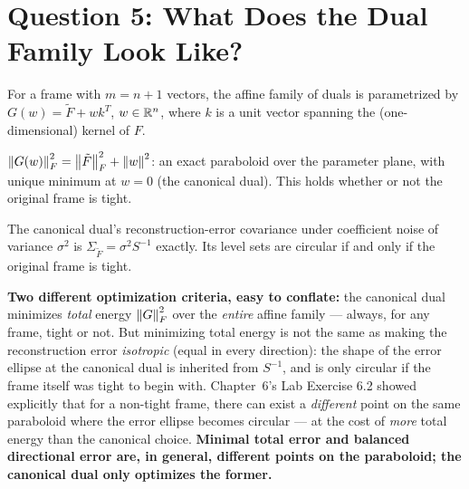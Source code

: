 \section{Question 5: What Does the Dual Family Look Like?}
\label{sec:review-q5}

\begin{proposition}
\label{rev:prop-dual-plane}
For a frame with $m=n+1$ vectors, the affine family of duals is
parametrized by $G(w)=\tilde F+wk^T$, $w\in\mathbb{R}^n$, where $k$ is a unit
vector spanning the (one-dimensional) kernel of $F$.
\end{proposition}

\begin{theorem}
\label{rev:thm-paraboloid}
$\left\| G(w) \right\|_F^2=\left\| \tilde F \right\|_F^2+\left\| w \right\|^2$: an exact paraboloid
over the parameter plane, with unique minimum at $w=0$ (the canonical
dual). This holds whether or not the original frame is tight.
\end{theorem}

\begin{proposition}
\label{rev:prop-error-cov}
The canonical dual's reconstruction-error covariance under coefficient
noise of variance $\sigma^2$ is $\Sigma_{\tilde F}=\sigma^2S^{-1}$
exactly. Its level sets are circular if and only if the original frame
is tight.
\end{proposition}

\begin{reviewbox}
\textbf{Two different optimization criteria, easy to conflate:} the
canonical dual minimizes \emph{total} energy $\left\| G \right\|_F^2$ over the
\emph{entire} affine family --- always, for any frame, tight or not.
But minimizing total energy is not the same as making the
reconstruction error \emph{isotropic} (equal in every direction): the
shape of the error ellipse at the canonical dual is inherited from
$S^{-1}$, and is only circular if the frame itself was tight to begin
with. Chapter~6's Lab Exercise 6.2 showed explicitly that for a
non-tight frame, there can exist a \emph{different} point on the same
paraboloid where the error ellipse becomes circular --- at the cost of
\emph{more} total energy than the canonical choice. \textbf{Minimal
total error and balanced directional error are, in general, different
points on the paraboloid; the canonical dual only optimizes the
former.}
\end{reviewbox}

